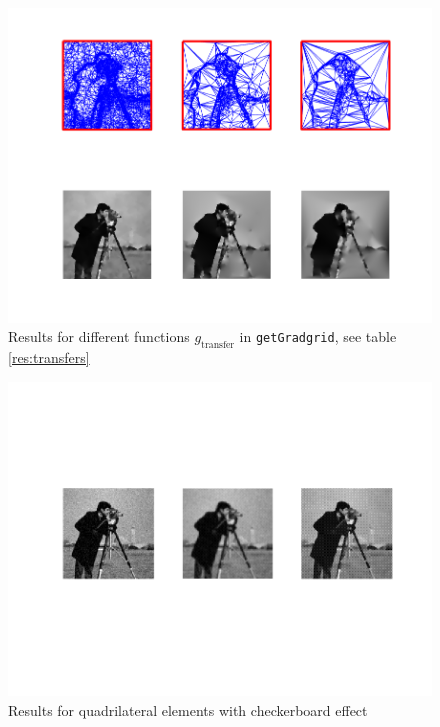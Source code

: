 \documentclass{report}
\begin{document}
\begin{figure}
	\centering
	\includegraphics[]{../out/report_transfers.png}
	\caption{Results for different functions $g_\text{transfer}$ in \texttt{getGradgrid}, see table \ref{res:transfers}}
	\label{vis:transfers}
\end{figure}

\begin{figure}
	\centering
	\includegraphics[]{../out/report_tet.png}
	\caption{Results for quadrilateral elements with checkerboard effect}
	\label{vis:tet}
\end{figure}
\end{document}
